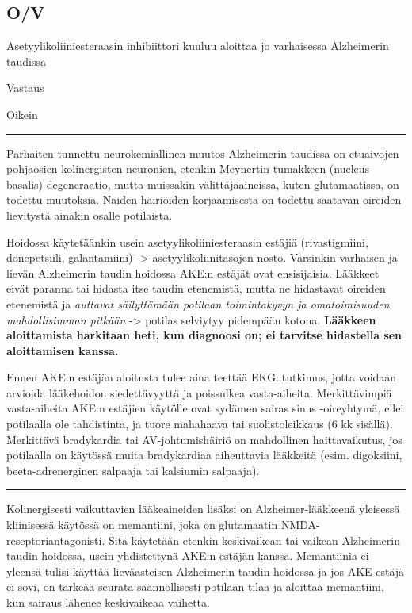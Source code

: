 \documentclass[
]{book}
\begin{document}
\subsection{O/V}\label{ov-29}

Asetyylikoliiniesteraasin inhibiittori kuuluu aloittaa jo varhaisessa Alzheimerin taudissa

Vastaus

Oikein

\begin{center}\rule{0.5\linewidth}{0.5pt}\end{center}

Parhaiten tunnettu neurokemiallinen muutos Alzheimerin taudissa on etuaivojen pohjaosien kolinergisten neuronien, etenkin Meynertin tumakkeen (nucleus basalis) degeneraatio, mutta muissakin välittäjäaineissa, kuten glutamaatissa, on todettu muutoksia. Näiden häiriöiden korjaamisesta on todettu saatavan oireiden lievitystä ainakin osalle potilaista.

Hoidossa käytetäänkin usein asetyylikoliiniesteraasin estäjiä (rivastigmiini, donepetsiili, galantamiini) -\textgreater{} asetyylikoliinitasojen nosto. Varsinkin varhaisen ja lievän Alzheimerin taudin hoidossa AKE:n estäjät ovat ensisijaisia. Lääkkeet eivät paranna tai hidasta itse taudin etenemistä, mutta ne hidastavat oireiden etenemistä ja \emph{auttavat säilyttämään potilaan toimintakyvyn ja omatoimisuuden mahdollisimman pitkään} -\textgreater{} potilas selviytyy pidempään kotona. \textbf{Lääkkeen aloittamista harkitaan heti, kun diagnoosi on; ei tarvitse hidastella sen aloittamisen kanssa.}

Ennen AKE:n estäjän aloitusta tulee aina teettää EKG::tutkimus, jotta voidaan arvioida lääkehoidon siedettävyyttä ja poissulkea vasta-aiheita. Merkittävimpiä vasta-aiheita AKE:n estäjien käytölle ovat sydämen sairas sinus -oireyhtymä, ellei potilaalla ole tahdistinta, ja tuore mahahaava tai suolistoleikkaus (6 kk sisällä). Merkittävä bradykardia tai AV-johtumishäiriö on mahdollinen haittavaikutus, jos potilaalla on käytössä muita bradykardiaa aiheuttavia lääkkeitä (esim. digoksiini, beeta-adrenerginen salpaaja tai kalsiumin salpaaja).

\begin{center}\rule{0.5\linewidth}{0.5pt}\end{center}

Kolinergisesti vaikuttavien lääkeaineiden lisäksi on Alzheimer-lääkkeenä yleisessä kliinisessä käytössä on memantiini, joka on glutamaatin NMDA-reseptoriantagonisti. Sitä käytetään etenkin keskivaikean tai vaikean Alzheimerin taudin hoidossa, usein yhdistettynä AKE:n estäjän kanssa. Memantiinia ei yleensä tulisi käyttää lieväasteisen Alzheimerin taudin hoidossa ja jos AKE-estäjä ei sovi, on tärkeää seurata säännöllisesti potilaan tilaa ja aloittaa memantiini, kun sairaus lähenee keskivaikeaa vaihetta.
\end{document}
